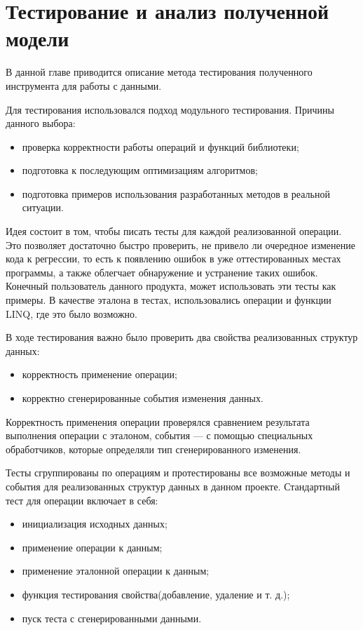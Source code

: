 \chapter{Тестирование и анализ полученной модели}
\label{sec:analysis}

В данной главе приводится описание метода тестирования полученного инструмента для работы с данными.

Для тестирования использовался подход модульного тестирования. Причины данного выбора:

\begin{itemize}
  \item проверка корректности работы операций и функций библиотеки;
  \item подготовка к последующим оптимизациям алгоритмов;
  \item подготовка примеров использования разработанных методов в реальной ситуации.
\end{itemize}

Идея состоит в том, чтобы писать тесты для каждой реализованной операции.
Это позволяет достаточно быстро проверить, не привело ли очередное изменение кода к регрессии,
то есть к появлению ошибок в уже оттестированных местах программы,
а также облегчает обнаружение и устранение таких ошибок. Конечный пользователь данного продукта,
может использовать эти тесты как примеры. В качестве эталона в тестах,
использовались операции и функции LINQ, где это было возможно.

В ходе тестирования важно было проверить два свойства реализованных структур данных:

\begin{itemize}
  \item корректность применение операции;
  \item корректно сгенерированные события изменения данных.
\end{itemize}

Корректность применения операции проверялся сравнением результата выполнения операции с эталоном,
события --- с помощью специальных обработчиков, которые определяли тип сгенерированного изменения.

Тесты сгруппированы по операциям и протестированы все возможные методы и события
для реализованных структур данных в данном проекте. Стандартный тест для операции включает в себя:

\begin{itemize}
  \item инициализация исходных данных;
  \item применение операции к данным;
  \item применение эталонной операции к данным;
  \item функция тестирования свойства(добавление, удаление и т. д.);
  \item пуск теста с сгенерированными данными.
\end{itemize}

